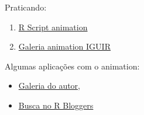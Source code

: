 \begin{frame}
  Praticando:
  
  \begin{enumerate}
    \itemsep1pt\parskip0pt
  \item
    \href{run:./R/animation/animation.R}{R Script animation}
  \item 
	\href{run:./animation/animation.html}{Galeria animation IGUIR}
  \end{enumerate}

  Algumas aplicações com o animation:
  \begin{itemize}
    \itemsep1pt\parskip0pt
  \item \href{http://vis.supstat.com/categories.html\#animation-ref}{Galeria
      do autor},
  \item \href{http://www.r-bloggers.com/?s=animation}{Busca no R
      Bloggers}
  \end{itemize}

\end{frame}
